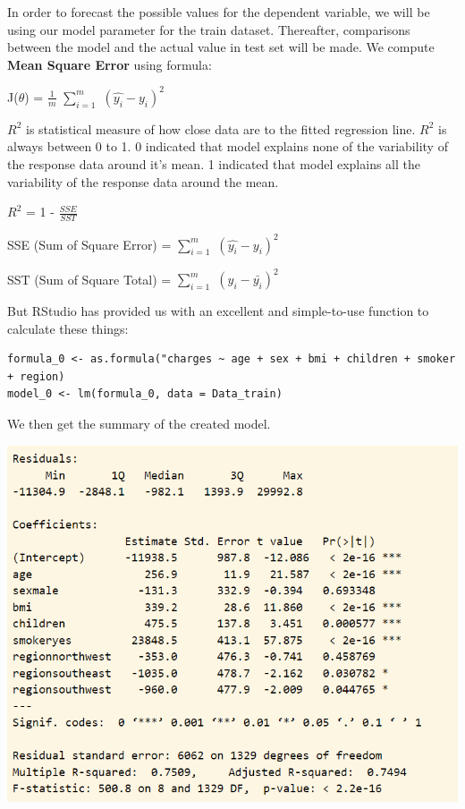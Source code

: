 \documentclass[a4paper]{article}
\begin{document}
In order to forecast the possible values for the dependent variable, we will be using our model parameter for the train dataset. Thereafter, comparisons between the model and the actual value in test set will be made. We compute \textbf{Mean Square Error} using formula:
\begin{center}
    J($\theta$) = $\frac{1}{m}$ $\sum_{i=1}^{m}$ $(\hat{y_i} - y_i)^{2}$
\end{center}
$R^2$ is statistical measure of how close data are to the fitted regression line. $R^2$ is always between 0 to 1. 0 indicated that model explains none of the variability of the response data around it's mean. 1 indicated that model explains all the variability of the response data around the mean.
\begin{center}
    $R^2$ = 1 - $\frac{SSE}{SST}$
\end{center}
\begin{center}
    SSE (Sum of Square Error) = $\sum_{i=1}^{m}$ $(\hat{y_i} - y_i)^{2}$
\end{center}
\begin{center}
    SST (Sum of Square Total) = $\sum_{i=1}^{m}$ $(y_i - \bar{y_i})^{2}$
\end{center}
But RStudio has provided us with an excellent and simple-to-use function to calculate these things:
\begin{lstlisting}
formula_0 <- as.formula("charges ~ age + sex + bmi + children + smoker + region)
model_0 <- lm(formula_0, data = Data_train)
\end{lstlisting}
We then get the summary of the created model.
\begin{center}
\includegraphics[width=14cm]{img/summary.png}
\end{center}
\end{document}
